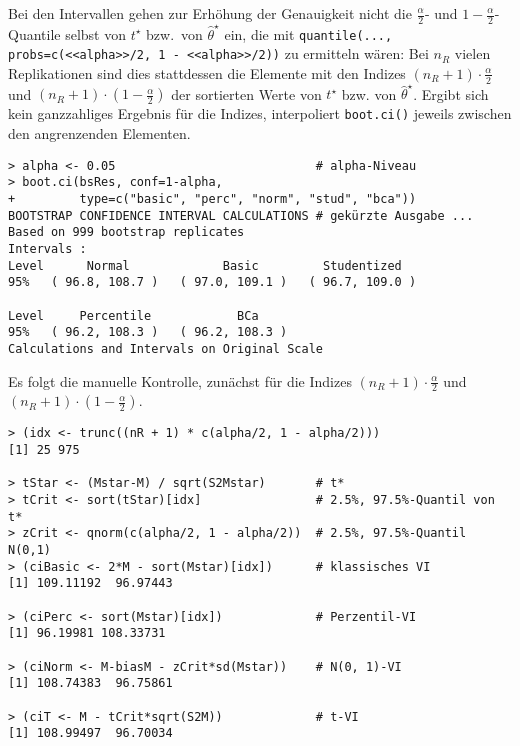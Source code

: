 Bei den Intervallen gehen zur Erhöhung der Genauigkeit nicht die $\frac{\alpha}{2}$- und $1-\frac{\alpha}{2}$-Quantile selbst von $t^{\star}$ bzw.\ von $\hat{\theta}^{\star}$ ein, die mit \lstinline!quantile(..., probs=c(<<alpha>>/2, 1 - <<alpha>>/2))! zu ermitteln wären: Bei $n_{R}$ vielen Replikationen sind dies stattdessen die Elemente mit den Indizes $(n_{R}+1) \cdot \frac{\alpha}{2}$ und $(n_{R}+1) \cdot (1-\frac{\alpha}{2})$ der sortierten Werte von $t^{\star}$ bzw. von $\hat{\theta}^{\star}$. Ergibt sich kein ganzzahliges Ergebnis für die Indizes, interpoliert \lstinline!boot.ci()! jeweils zwischen den angrenzenden Elementen.
\begin{lstlisting}
> alpha <- 0.05                            # alpha-Niveau
> boot.ci(bsRes, conf=1-alpha,
+         type=c("basic", "perc", "norm", "stud", "bca"))
BOOTSTRAP CONFIDENCE INTERVAL CALCULATIONS # gekürzte Ausgabe ...
Based on 999 bootstrap replicates
Intervals :
Level      Normal             Basic         Studentized
95%   ( 96.8, 108.7 )   ( 97.0, 109.1 )   ( 96.7, 109.0 )

Level     Percentile            BCa
95%   ( 96.2, 108.3 )   ( 96.2, 108.3 )
Calculations and Intervals on Original Scale
\end{lstlisting}

Es folgt die manuelle Kontrolle, zunächst für die Indizes $(n_{R}+1) \cdot \frac{\alpha}{2}$ und $(n_{R}+1) \cdot (1-\frac{\alpha}{2})$.
\begin{lstlisting}
> (idx <- trunc((nR + 1) * c(alpha/2, 1 - alpha/2)))
[1] 25 975

> tStar <- (Mstar-M) / sqrt(S2Mstar)       # t*
> tCrit <- sort(tStar)[idx]                # 2.5%, 97.5%-Quantil von t*
> zCrit <- qnorm(c(alpha/2, 1 - alpha/2))  # 2.5%, 97.5%-Quantil N(0,1)
> (ciBasic <- 2*M - sort(Mstar)[idx])      # klassisches VI
[1] 109.11192  96.97443

> (ciPerc <- sort(Mstar)[idx])             # Perzentil-VI
[1] 96.19981 108.33731

> (ciNorm <- M-biasM - zCrit*sd(Mstar))    # N(0, 1)-VI
[1] 108.74383  96.75861

> (ciT <- M - tCrit*sqrt(S2M))             # t-VI
[1] 108.99497  96.70034
\end{lstlisting}

